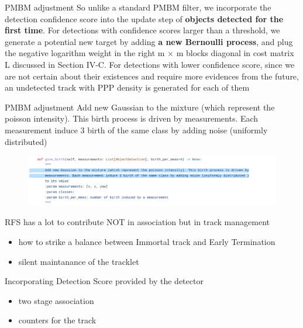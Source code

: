 \documentclass[aspectratio=169,xcolor=dvipsnames]{beamer}
\begin{document}
\begin{frame}{PMBM adjustment}
    So unlike a standard PMBM filter, we incorporate the detection confidence score into the update step 
    of \textbf{objects detected for the first time}. 
    For detections with confidence scores larger than a threshold, 
    we generate a potential new target by adding \textbf{a new Bernoulli process}, 
    and plug the negative logarithm weight in the right m × m blocks diagonal in cost matrix L 
    discussed in Section IV-C. For detections with lower confidence score, 
    since we are not certain about their existences and require more evidences from the future, 
    an undetected track with PPP density is generated for each of them
\end{frame}

\begin{frame}{PMBM adjustment}
    Add new Gaussian to the mixture (which represent the poisson intensity). This birth process is driven by
    measurements. Each measurement induce 3 birth of the same class by adding noise (uniformly distributed)
    \href{https://github.com/quan-dao/pmbm-filter/blob/5cdf8b31665f1a7008afa963c1ab7c3b048b5856/poisson.py}{}

    \begin{figure}
        \includegraphics[width=0.9\linewidth]{pmbm/1.png}
    \end{figure}
\end{frame}

\begin{frame}{RFS has a lot to contribute NOT in association but in track management}
    \begin{itemize}
        \item{how to strike a balance between Immortal track and Early Termination}
        \item{silent maintanance of the tracklet}
    \end{itemize}
\end{frame}

\begin{frame}{Incorporating Detection Score provided by the detector}
    \begin{itemize}
        \item{two stage association}
        \item{counters for the track}
    \end{itemize}
\end{frame}
\end{document}
